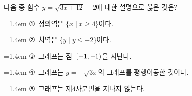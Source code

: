 다음 중 함수 $y=\sqrt{3x+12}-2$에 대한 설명으로 옳은 것은?
\par\medskip\par\noindent\hangindent=1.4em {\small ①}\ 정의역은 $\{x \mid x\ge 4\}$이다.\par\noindent\hangindent=1.4em {\small ②}\ 치역은 $\{y \mid y\le -2\}$이다.\par\noindent\hangindent=1.4em {\small ③}\ 그래프는 점~$(-1{,}\mkern3mu\mathopen{}-1)$을 지난다.\par\noindent\hangindent=1.4em {\small ④}\ 그래프는 $y=-\sqrt{3x}$의 그래프를 평행이동한 것이다.\par\noindent\hangindent=1.4em {\small ⑤}\ 그래프는 제$4$사분면을 지나지 않는다.\par\medskip
